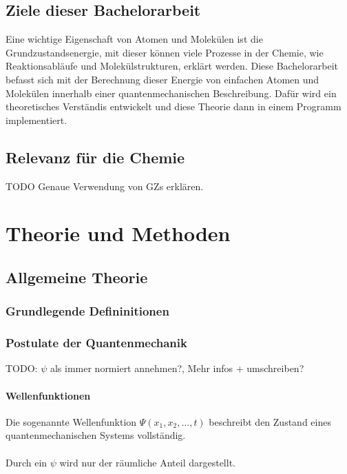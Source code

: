 \documentclass[a4paper, 12pt]{report}
\begin{document}
\section{Ziele dieser Bachelorarbeit}
Eine wichtige Eigenschaft von Atomen und Molekülen ist die Grundzustandsenergie, 
mit dieser können viele Prozesse in der Chemie,
wie Reaktionsabläufe und Molekülstrukturen, erklärt werden.
Diese Bachelorarbeit befasst sich mit der Berechnung 
dieser Energie von einfachen Atomen und Molekülen innerhalb einer quantenmechanischen Beschreibung.
Dafür wird ein theoretisches Verständis entwickelt 
und diese Theorie dann in einem Programm implementiert.

\section{Relevanz für die Chemie}
TODO Genaue Verwendung von GZs erklären. 

\chapter{Theorie und Methoden}
\section{Allgemeine Theorie}
\subsection{Grundlegende Defininitionen}
\subsection{Postulate der Quantenmechanik}
TODO: $\psi$ als immer normiert annehmen?, Mehr infos + umschreiben?
\subsubsection{Wellenfunktionen}
Die sogenannte Wellenfunktion $\Psi(x_1, x_2, \dots, t)$ 
beschreibt den Zustand eines quantenmechanischen Systems vollständig.\cite[S. 20-21]{atkins_friedman_2011}\\\\
Durch ein $\psi$ wird nur der räumliche Anteil dargestellt.
\end{document}
